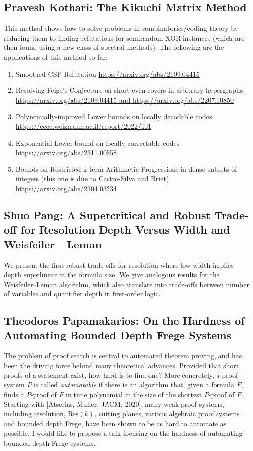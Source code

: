 \documentclass[11pt]{article}
\begin{document}
\subsection*{Pravesh Kothari: The Kikuchi Matrix Method}\label{Kothari}

This method shows how to solve problems in combinatorics/coding theory by reducing them to finding refutations for semirandom XOR instances (which are then found using a new class of spectral methods). The following are the applications of this method so far:
\begin{enumerate}
\item Smoothed CSP Refutation \url{https://arxiv.org/abs/2109.04415} 
\item Resolving Feige's Conjecture on short even covers in arbitrary hypergraphs \url{https://arxiv.org/abs/2109.04415 and https://arxiv.org/abs/2207.10850} 
\item Polynomially-improved Lower bounds on locally decodable codes \url{https://eccc.weizmann.ac.il/report/2022/101} 
\item Exponential Lower bound on locally correctable codes \url{https://arxiv.org/abs/2311.00558} 
\item Bounds on Restricted k-term Arithmetic Progressions in dense subsets of integers (this one is due to Castro-Silva and Briet) \url{https://arxiv.org/abs/2304.03234}
\end{enumerate}

\subsection*{Shuo Pang: A Supercritical and Robust Trade-off for Resolution Depth Versus Width and Weisfeiler—Leman}\label{Pang}
We present the first robust trade-offs for resolution where low width implies depth superlinear in the formula size. We give analogous results for the Weisfeiler--Leman algorithm, which also translate into trade-offs between number of variables and quantifier depth in first-order logic.

\subsection*{Theodoros Papamakarios: On the Hardness of Automating Bounded Depth Frege Systems}\label{Papamakarios}
The problem of proof search is central to automated theorem proving, and has been the driving force behind many theoretical advances: Provided that short proofs of a statement exist, how hard is to find one? More concretely, a proof system $P$ is called \emph{automatable} if there is an algorithm that, given a formula $F$, finds a $P$-proof of $F$ in time polynomial in the size of the shortest $P$-proof of $F$. Starting with [Atserias, Muller, JACM, 2020], many weak proof systems, including resolution, $\mathrm{Res}(k)$, cutting planes, various algebraic proof systems and bounded depth Frege, have been shown to be as hard to automate as possible. I would like to propose a talk focusing on the hardness of automating bounded depth Frege systems.
\end{document}
